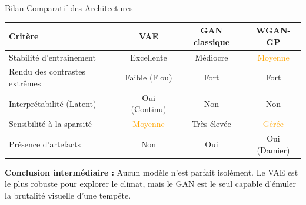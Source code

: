\documentclass[10pt, aspectratio=169]{beamer}
\begin{document}
\begin{frame}{Bilan Comparatif des Architectures}
    \begin{table}
        \centering
        \small
        \begin{tabular}{lccc}
            \toprule
            \textbf{Critère} & \textbf{VAE} & \textbf{GAN classique} & \textbf{WGAN-GP} \\
            \midrule
            Stabilité d'entraînement & \textcolor{green!70!black}{Excellente} & \textcolor{red!70!black}{Médiocre} & \textcolor{orange}{Moyenne} \\
            Rendu des contrastes extrêmes & \textcolor{red!70!black}{Faible (Flou)} & \textcolor{green!70!black}{Fort} & \textcolor{green!70!black}{Fort} \\
            Interprétabilité (Latent) & \textcolor{green!70!black}{Oui (Continu)} & \textcolor{red!70!black}{Non} & \textcolor{red!70!black}{Non} \\
            Sensibilité à la sparsité & \textcolor{orange}{Moyenne} & \textcolor{red!70!black}{Très élevée} & \textcolor{orange}{Gérée} \\
            Présence d'artefacts & \textcolor{green!70!black}{Non} & \textcolor{red!70!black}{Oui} & \textcolor{red!70!black}{Oui (Damier)} \\
            \bottomrule
        \end{tabular}
    \end{table}
    \vspace{0.4cm}
    \textbf{Conclusion intermédiaire :} Aucun modèle n'est parfait isolément. Le VAE est le plus robuste pour explorer le climat, mais le GAN est le seul capable d'émuler la brutalité visuelle d'une tempête.
\end{frame}
\end{document}
